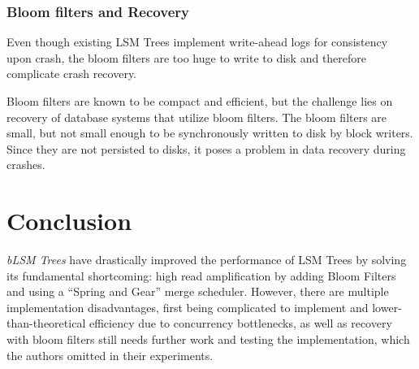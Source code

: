 \documentclass{article}
\theoremstyle{plain}
\begin{document}
\subsubsection{Bloom filters and Recovery}
Even though existing LSM Trees implement write-ahead logs for consistency upon
crash, the bloom filters are too huge to write to disk and therefore complicate
crash recovery.

\medskip
Bloom filters are known to be compact and efficient, but the challenge lies on
recovery of database systems that utilize bloom filters. The bloom filters are
small, but not small enough to be synchronously written to disk by block
writers. Since they are not persisted to disks, it poses a problem in data
recovery during crashes.

\section{Conclusion}
\emph{bLSM Trees} have drastically improved the performance of LSM Trees by
solving its fundamental shortcoming: high read amplification by adding Bloom
Filters and using a ``Spring and Gear'' merge scheduler. However, there are
multiple implementation disadvantages, first being complicated to implement and
lower-than-theoretical efficiency due to concurrency bottlenecks, as well as
recovery with bloom filters still needs further work and testing the
implementation, which the authors omitted in their experiments.

\printbibliography
\end{document}
